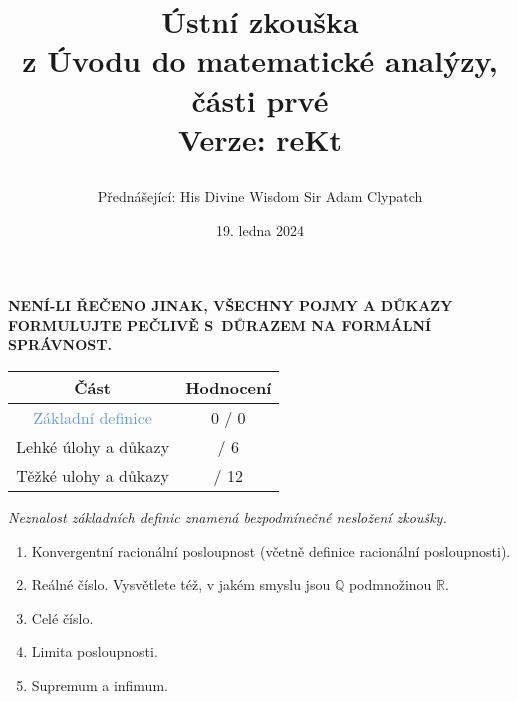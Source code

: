 \documentclass[a4paper,11pt]{article}
\title{\Huge\textsf{Ústní zkouška}\\
 \Large\textsf{z Úvodu do matematické analýzy, části prvé}\\
 \vspace*{1em}
 Verze: reKt\\
 \author{Přednášející: His Divine Wisdom Sir Adam Clypatch}
 \date{19. ledna 2024}
}
\newcommand{\R}{\mathbb{R}}
\newcommand{\Q}{\mathbb{Q}}
\begin{document}
 \maketitle
 \begin{tcolorbox}[boxsep=3mm,arc=0mm,toprule=1pt,bottomrule=1pt,leftrule=-0.1mm,
   rightrule=-0.1mm,colframe=red!90!black]
  \vspace*{-2pt}
  \begin{center}
   \textbf{NENÍ-LI ŘEČENO JINAK, VŠECHNY POJMY A DŮKAZY FORMULUJTE PEČLIVĚ
   S~DŮRAZEM NA FORMÁLNÍ SPRÁVNOST.}
  \end{center}
 \end{tcolorbox}
 \vspace*{\fill}
 \begin{center}
  \begin{tabular}{c|c}
   \textsf{\textbf{Část}} & \textsf{\textbf{Hodnocení}}\\
   \toprule
   \textcolor{CornflowerBlue}{Základní definice} & 0 / 0\\
   \textcolor{Emerald}{Lehké úlohy a důkazy} & \hspace{2ex}/ 6\\
   \textcolor{BrickRed}{Těžké ulohy a důkazy} & \hspace{2ex} / 12
  \end{tabular}
 \end{center}
 \vspace*{\fill}
 \clearpage
 \begin{tcolorbox}[title=\textsf{Základní
   definice (0 bodů)},arc=0mm,boxsep=3mm,bottomrule=1pt,toprule=3pt,leftrule=-0.1mm,
   rightrule=-0.1mm,colframe=CornflowerBlue!80!white,
   colback=CornflowerBlue!5!white]
  \emph{Neznalost základních definic znamená bezpodmínečné nesložení
  zkoušky.}
  \begin{enumerate}
   \item Konvergentní racionální posloupnost (včetně definice racionální
    posloupnosti).
   \item Reálné číslo. Vysvětlete též, v jakém smyslu jsou $\Q$ podmnožinou
    $\R$.
   \item Celé číslo.
   \item Limita posloupnosti.
   \item Supremum a infimum.
  \end{enumerate}
 \end{tcolorbox}
 \clearpage
\end{document}
